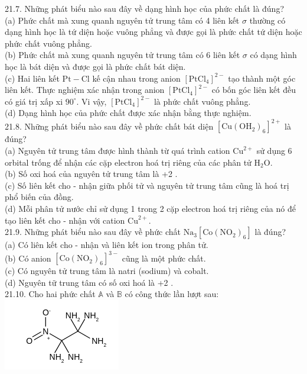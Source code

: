 \documentclass[10pt]{article}
\begin{document}
21.7. Những phát biểu nào sau đây về dạng hình học của phức chất là đúng?\\
(a) Phức chất mà xung quanh nguyên tử trung tâm có 4 liên kết $\sigma$ thường có dạng hình học là tứ diện hoặc vuông phẳng và được gọi là phức chất tứ diện hoặc phức chất vuông phẳng.\\
(b) Phức chất mà xung quanh nguyên tử trung tâm có 6 liên kết $\sigma$ có dạng hình học là bát diện và được gọi là phức chất bát diện.\\
(c) Hai liên kết $\mathrm{Pt}-\mathrm{Cl}$ kế cận nhau trong anion $\left[\mathrm{PtCl}_{4}\right]^{2-}$ tạo thành một góc liên kết. Thực nghiệm xác nhận trong anion $\left[\mathrm{PtCl}_{4}\right]^{2-}$ có bốn góc liên kết đều có giá trị xấp xi $90^{\circ}$. Vi vậy, $\left[\mathrm{PtCl}_{4}\right]^{2-}$ là phức chất vuông phẳng.\\
(d) Dạng hình học của phức chất được xác nhận bằng thực nghiệm.\\
21.8. Những phát biểu nào sau đây về phức chất bát diện $\left[\mathrm{Cu}\left(\mathrm{OH}_{2}\right)_{6}\right]^{2+}$ là đúng?\\
(a) Nguyên tử trung tâm được hình thành từ quá trình cation $\mathrm{Cu}^{2+}$ sử dụng 6 orbital trống để nhận các cặp electron hoá trị riêng của các phân tử $\mathrm{H}_{2} \mathrm{O}$.\\
(b) Số oxi hoá của nguyên tử trung tâm là +2 .\\
(c) Số liên kết cho - nhận giữa phối tử và nguyên tử trung tâm cũng là hoá trị phổ biến của đồng.\\
(d) Mỗi phân tử nước chỉ sử dụng 1 trong 2 cặp electron hoá trị riêng của nó để tạo liên kết cho - nhận với cation $\mathrm{Cu}^{2+}$.\\
21.9. Những phát biểu nào sau đây về phức chất $\mathrm{Na}_{3}\left[\mathrm{Co}\left(\mathrm{NO}_{2}\right)_{6}\right]$ là đúng?\\
(a) Có liên kết cho - nhận và liên kết ion trong phân tử.\\
(b) Có anion $\left[\mathrm{Co}\left(\mathrm{NO}_{2}\right)_{6}\right]^{3-}$ cũng là một phức chất.\\
(c) Có nguyên tử trung tâm là natri (sodium) và cobalt.\\
(d) Nguyên tữ trung tâm có số oxi hoá là +2 .\\
21.10. Cho hai phức chất $\mathbb{A}$ và $\mathbb{B}$ có công thức lần lượt sau:\\
\includegraphics{smile-e0aef3923a84f36338d2f465f2695420597f5779}
\end{document}
